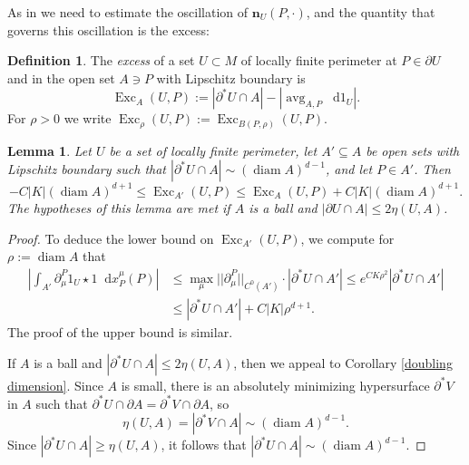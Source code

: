 \documentclass[reqno,10pt]{amsart}
\DeclareMathOperator{\avg}{avg}
\DeclareMathOperator{\diam}{diam}
\DeclareMathOperator{\Exc}{Exc}
\newcommand*\dif{\mathop{}\!\mathrm{d}}
\newcommand{\normal}{\mathbf n}
\newcommand{\dfn}[1]{\emph{#1}\index{#1}}
\newtheorem{lemma}[theorem]{Lemma}
\theoremstyle{definition}
\newtheorem{definition}[theorem]{Definition}
\numberwithin{equation}{section}
\begin{document}
As in \cite[Chapters 8-9]{Giusti77} we need to estimate the oscillation of $\normal_U(P, \cdot)$, and the quantity that governs this oscillation is the excess:

\begin{definition}
The \dfn{excess} of a set $U \subset M$ of locally finite perimeter at $P \in \partial U$ and in the open set $A \ni P$ with Lipschitz boundary is
$$\Exc_A(U, P) := |\partial^* U \cap A| - \left|\avg_{A, P} \dif 1_U\right|.$$
For $\rho > 0$ we write $\Exc_\rho(U, P) := \Exc_{B(P, \rho)}(U, P)$.
\end{definition}

\begin{lemma}
Let $U$ be a set of locally finite perimeter, let $A' \subseteq A$ be open sets with Lipschitz boundary such that $|\partial^* U \cap A| \sim (\diam A)^{d - 1}$,
and let $P \in A'$. Then
\begin{equation}\label{approximate monotone}
-C |K| (\diam A)^{d + 1} \leq \Exc_{A'}(U, P) \leq \Exc_A(U, P) + C |K|(\diam A)^{d + 1}.
\end{equation}
The hypotheses of this lemma are met if $A$ is a ball and $|\partial U \cap A| \leq 2\eta(U, A)$.
\end{lemma}
\begin{proof}
To deduce the lower bound on $\Exc_{A'}(U, P)$, we compute for $\rho := \diam A$ that
\begin{align*}
    \left|\int_{A'} \partial^P_\mu 1_U \star 1 \dif x_P^\mu(P)\right|
 & \leq \max_\mu ||\partial^P_\mu||_{C^0(A')} \cdot |\partial^* U \cap A'| \leq e^{CK\rho^2} |\partial^* U \cap A'| \\
 & \leq |\partial^* U \cap A'| + C|K|\rho^{d + 1}.
\end{align*}
The proof of the upper bound is similar.

If $A$ is a ball and $|\partial^* U \cap A| \leq 2\eta(U, A)$, then we appeal to Corollary \ref{doubling dimension}.
Since $A$ is small, there is an absolutely minimizing hypersurface $\partial^* V$ in $A$ such that $\partial^* U \cap \partial A = \partial^* V \cap \partial A$, so
$$\eta(U, A) = |\partial^* V \cap A| \sim (\diam A)^{d - 1}.$$
Since $|\partial^* U \cap A| \geq \eta(U, A)$, it follows that $|\partial^* U \cap A| \sim (\diam A)^{d - 1}$.
\end{proof}






\end{document}
